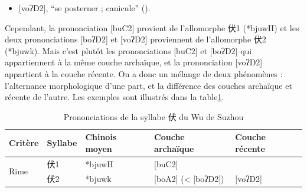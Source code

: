 \documentclass{scrbook}
\newcounter{c}[subsubsection]
\newcommand{\difwenbai}{couches archaïque et récente\xspace}
\newcommand{\illustre}{Les exemples sont illustrés dans la table\xspace}
\begin{document}
\begin{sloppypar}
\begin{itemize}
\item{[voʔD2], ``se posterner ; canicule'' (\cite[296]{Ye1993Suzhou}).}
\end{itemize}

Cependant, la prononciation [buC2] provient de l'allomorphe 伏1 (*bjuwH) et les deux prononciations [boʔD2] et [voʔD2] proviennent de l'allomorphe 伏2 (*bjuwk). Mais c'est plutôt les prononciations [buC2] et [boʔD2] qui appartiennent à la même couche archaïque, et la prononciation [voʔD2] appartient à la couche récente. On a donc un mélange de deux phénomènes : l'alternance morphologique d'une part, et la différence des \difwenbai de l'autre. \illustre \ref{tab:exemple_morpho1}.

\begin{table}[htbp]
  \centering
    \begin{tabular}{lllll}
    \toprule
    Critère & Syllabe & Chinois moyen  & Couche archaïque & Couche récente \\
    \midrule
    \multirow{2}[2]{*}{Rime} & 伏1    & *bjuwH & [buC2] &  \\
          & 伏2    & *bjuwk & [boA2] (< [boʔD2]) & [voʔD2] \\
    \bottomrule
    \end{tabular}%
  \caption{Prononciations de la syllabe 伏 du Wu de Suzhou}
  \label{tab:exemple_morpho1}%
\end{table}%


\end{sloppypar}
\end{document}
